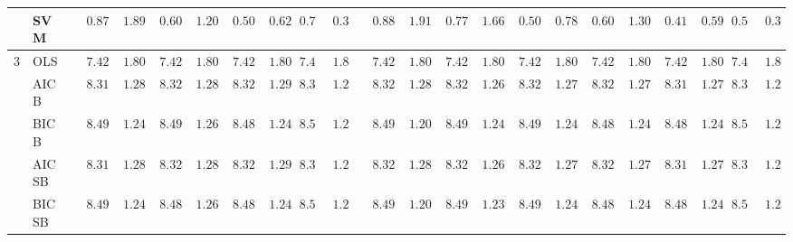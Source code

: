 \documentclass{article}
\begin{document}
\begin{tabular}{ll|ll|llllll|llllll|llllll}
 & SVM  & $\phantom{00}0.87$ & $\phantom{00}1.89$ & $\phantom{00}0.60$ & $\phantom{00}1.20$ & $\phantom{00}0.50$ & $\phantom{00}0.62$ & $\phantom{0}0.77$ & $\phantom{0}0.32$ & $\phantom{00}0.88$ & $\phantom{00}1.91$ & $\phantom{00}0.77$ & $\phantom{00}1.66$ & $\phantom{00}0.50$ & $\phantom{00}0.78$ & $\phantom{00}0.60$ & $\phantom{00}1.30$ & $\phantom{00}0.41$ & $\phantom{00}0.59$ & $\phantom{0}0.57$ & $\phantom{0}0.37$ \\\hline
3 & OLS  & $\phantom{00}7.42$ & $\phantom{00}1.80$ & $\phantom{00}7.42$ & $\phantom{00}1.80$ & $\phantom{00}7.42$ & $\phantom{00}1.80$ & $\phantom{0}7.42$ & $\phantom{0}1.80$ & $\phantom{00}7.42$ & $\phantom{00}1.80$ & $\phantom{00}7.42$ & $\phantom{00}1.80$ & $\phantom{00}7.42$ & $\phantom{00}1.80$ & $\phantom{00}7.42$ & $\phantom{00}1.80$ & $\phantom{00}7.42$ & $\phantom{00}1.80$ & $\phantom{0}7.42$ & $\phantom{0}1.80$ \\
 & AIC B  & $\phantom{00}8.31$ & $\phantom{00}1.28$ & $\phantom{00}8.32$ & $\phantom{00}1.28$ & $\phantom{00}8.32$ & $\phantom{00}1.29$ & $\phantom{0}8.33$ & $\phantom{0}1.28$ & $\phantom{00}8.32$ & $\phantom{00}1.28$ & $\phantom{00}8.32$ & $\phantom{00}1.26$ & $\phantom{00}8.32$ & $\phantom{00}1.27$ & $\phantom{00}8.32$ & $\phantom{00}1.27$ & $\phantom{00}8.31$ & $\phantom{00}1.27$ & $\phantom{0}8.31$ & $\phantom{0}1.29$ \\
 & BIC B  & $\phantom{00}8.49$ & $\phantom{00}1.24$ & $\phantom{00}8.49$ & $\phantom{00}1.26$ & $\phantom{00}8.48$ & $\phantom{00}1.24$ & $\phantom{0}8.53$ & $\phantom{0}1.22$ & $\phantom{00}8.49$ & $\phantom{00}1.20$ & $\phantom{00}8.49$ & $\phantom{00}1.24$ & $\phantom{00}8.49$ & $\phantom{00}1.24$ & $\phantom{00}8.48$ & $\phantom{00}1.24$ & $\phantom{00}8.48$ & $\phantom{00}1.24$ & $\phantom{0}8.53$ & $\phantom{0}1.26$ \\
 & AIC SB  & $\phantom{00}8.31$ & $\phantom{00}1.28$ & $\phantom{00}8.32$ & $\phantom{00}1.28$ & $\phantom{00}8.32$ & $\phantom{00}1.29$ & $\phantom{0}8.33$ & $\phantom{0}1.28$ & $\phantom{00}8.32$ & $\phantom{00}1.28$ & $\phantom{00}8.32$ & $\phantom{00}1.26$ & $\phantom{00}8.32$ & $\phantom{00}1.27$ & $\phantom{00}8.32$ & $\phantom{00}1.27$ & $\phantom{00}8.31$ & $\phantom{00}1.27$ & $\phantom{0}8.31$ & $\phantom{0}1.29$ \\
 & BIC SB  & $\phantom{00}8.49$ & $\phantom{00}1.24$ & $\phantom{00}8.48$ & $\phantom{00}1.26$ & $\phantom{00}8.48$ & $\phantom{00}1.24$ & $\phantom{0}8.53$ & $\phantom{0}1.22$ & $\phantom{00}8.49$ & $\phantom{00}1.20$ & $\phantom{00}8.49$ & $\phantom{00}1.23$ & $\phantom{00}8.49$ & $\phantom{00}1.24$ & $\phantom{00}8.48$ & $\phantom{00}1.24$ & $\phantom{00}8.48$ & $\phantom{00}1.24$ & $\phantom{0}8.52$ & $\phantom{0}1.25$ \\

\end{tabular}
\end{document}
